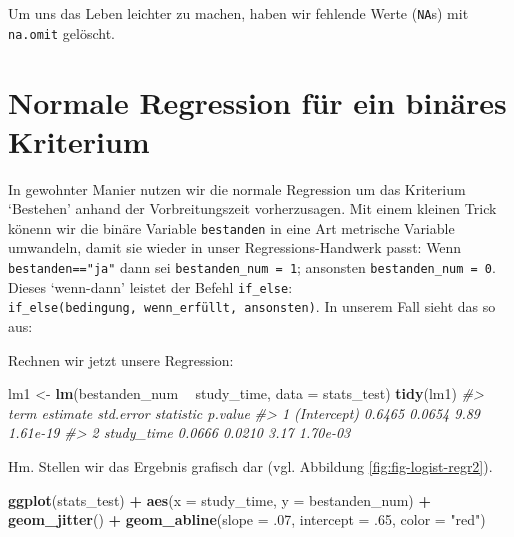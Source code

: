 \documentclass[12pt,ngerman,]{book}
\makeatletter
\newenvironment{Shaded}{\begin{snugshade}}{\end{snugshade}}
\newcommand{\KeywordTok}[1]{\textcolor[rgb]{0.13,0.29,0.53}{\textbf{#1}}}
\newcommand{\DataTypeTok}[1]{\textcolor[rgb]{0.13,0.29,0.53}{#1}}
\newcommand{\DecValTok}[1]{\textcolor[rgb]{0.00,0.00,0.81}{#1}}
\newcommand{\StringTok}[1]{\textcolor[rgb]{0.31,0.60,0.02}{#1}}
\newcommand{\CommentTok}[1]{\textcolor[rgb]{0.56,0.35,0.01}{\textit{#1}}}
\newcommand{\OperatorTok}[1]{\textcolor[rgb]{0.81,0.36,0.00}{\textbf{#1}}}
\newcommand{\NormalTok}[1]{#1}
\newenvironment{kframe}{%
\medskip{}
\setlength{\fboxsep}{.8em}
 \def\at@end@of@kframe{}%
 \ifinner\ifhmode%
  \def\at@end@of@kframe{\end{minipage}}%
  \begin{minipage}{\columnwidth}%
 \fi\fi%
 \def\FrameCommand##1{\hskip\@totalleftmargin \hskip-\fboxsep
 \colorbox{shadecolor}{##1}\hskip-\fboxsep
     \hskip-\linewidth \hskip-\@totalleftmargin \hskip\columnwidth}%
 \MakeFramed {\advance\hsize-\width
   \@totalleftmargin\z@ \linewidth\hsize
   \@setminipage}}%
 {\par\unskip\endMakeFramed%
 \at@end@of@kframe}
\renewenvironment{Shaded}{\begin{kframe}}{\end{kframe}}
\theoremstyle{definition}
\theoremstyle{definition}
\theoremstyle{remark}
\makeatother
\begin{document}
Um uns das Leben leichter zu machen, haben wir fehlende Werte
(\texttt{NA}s) mit \texttt{na.omit} gelöscht.

\section{Normale Regression für ein binäres
Kriterium}\label{normale-regression-fur-ein-binares-kriterium}

In gewohnter Manier nutzen wir die normale Regression um das Kriterium
`Bestehen' anhand der Vorbreitungszeit vorherzusagen. Mit einem kleinen
Trick könenn wir die binäre Variable \texttt{bestanden} in eine Art
metrische Variable umwandeln, damit sie wieder in unser
Regressions-Handwerk passt: Wenn \texttt{bestanden=="ja"} dann sei
\texttt{bestanden\_num\ =\ 1}; ansonsten \texttt{bestanden\_num\ =\ 0}.
Dieses `wenn-dann' leistet der Befehl \texttt{if\_else}:
\texttt{if\_else(bedingung,\ wenn\_erfüllt,\ ansonsten)}. In unserem
Fall sieht das so aus:

\begin{Shaded}
\end{Shaded}

Rechnen wir jetzt unsere Regression:

\begin{Shaded}
\begin{Highlighting}[]
\NormalTok{lm1 <-}\StringTok{ }\KeywordTok{lm}\NormalTok{(bestanden_num }\OperatorTok{~}\StringTok{ }\NormalTok{study_time, }\DataTypeTok{data =}\NormalTok{ stats_test)}
\KeywordTok{tidy}\NormalTok{(lm1)}
\CommentTok{#>          term estimate std.error statistic  p.value}
\CommentTok{#> 1 (Intercept)   0.6465    0.0654      9.89 1.61e-19}
\CommentTok{#> 2  study_time   0.0666    0.0210      3.17 1.70e-03}
\end{Highlighting}
\end{Shaded}

Hm. Stellen wir das Ergebnis grafisch dar (vgl. Abbildung
\ref{fig:fig-logist-regr2}).

\begin{Shaded}
\begin{Highlighting}[]

\KeywordTok{ggplot}\NormalTok{(stats_test) }\OperatorTok{+}
\StringTok{  }\KeywordTok{aes}\NormalTok{(}\DataTypeTok{x =}\NormalTok{ study_time, }\DataTypeTok{y =}\NormalTok{ bestanden_num) }\OperatorTok{+}
\StringTok{  }\KeywordTok{geom_jitter}\NormalTok{() }\OperatorTok{+}
\StringTok{  }\KeywordTok{geom_abline}\NormalTok{(}\DataTypeTok{slope =}\NormalTok{ .}\DecValTok{07}\NormalTok{, }\DataTypeTok{intercept =}\NormalTok{ .}\DecValTok{65}\NormalTok{, }\DataTypeTok{color =} \StringTok{"red"}\NormalTok{)}
\end{Highlighting}
\end{Shaded}
\end{document}
